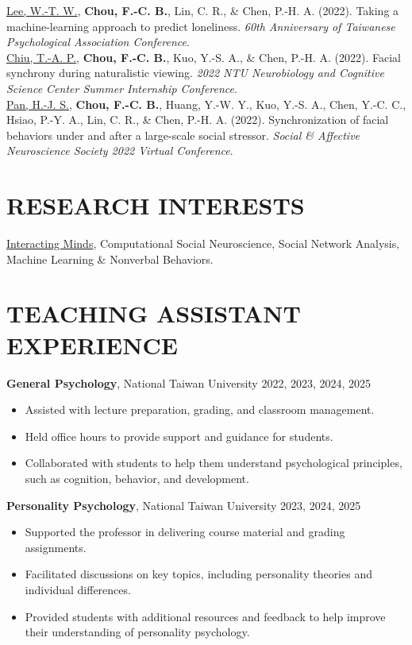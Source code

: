 \documentclass[a4paper,12pt]{article}
\newcommand{\sectionspace}{0pt} %
\newcommand{\itemspace}{7pt} %
\begin{document}
\noindent \underline{Lee, W.-T. W.}, \textbf{Chou, F.-C. B.}, Lin, C. R., \& Chen, P.-H. A. (2022). Taking a machine-learning approach to predict loneliness. \textit{60th Anniversary of Taiwanese Psychological Association Conference}.\\[\itemspace]
\noindent \underline{Chiu, T.-A. P.}, \textbf{Chou, F.-C. B.}, Kuo, Y.-S. A., \& Chen, P.-H. A. (2022). Facial synchrony during naturalistic viewing. \textit{2022 NTU Neurobiology and Cognitive Science Center Summer Internship Conference}.\\[\itemspace]
\noindent \underline{Pan, H.-J. S.}, \textbf{Chou, F.-C. B.}, Huang, Y.-W. Y., Kuo, Y.-S. A., Chen, Y.-C. C., Hsiao, P.-Y. A., Lin, C. R., \& Chen, P.-H. A. (2022). Synchronization of facial behaviors under and after a large-scale social stressor. \textit{Social \& Affective Neuroscience Society 2022 Virtual Conference}.\\[\itemspace]

\vspace{\sectionspace}

\section*{RESEARCH INTERESTS}
\href{https://www.interactingminds.com}{Interacting Minds}, Computational Social Neuroscience, Social Network Analysis, Machine Learning \& Nonverbal Behaviors. \\[\sectionspace]

\vspace{\sectionspace}

\section*{TEACHING ASSISTANT EXPERIENCE}

\noindent\textbf{General Psychology}, National Taiwan University  \hfill 2022, 2023, 2024, 2025
\begin{itemize}
    \item Assisted with lecture preparation, grading, and classroom management.
    \item Held office hours to provide support and guidance for students.
    \item Collaborated with students to help them understand psychological principles, such as cognition, behavior, and development.
\end{itemize}

\noindent\textbf{Personality Psychology}, National Taiwan University \hfill 2023, 2024, 2025
\begin{itemize}
    \item Supported the professor in delivering course material and grading assignments.
    \item Facilitated discussions on key topics, including personality theories and individual differences.
    \item Provided students with additional resources and feedback to help improve their understanding of personality psychology.
\end{itemize}
\end{document}
